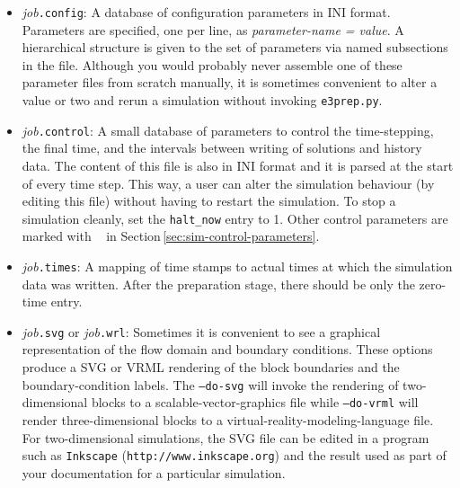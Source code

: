 \documentclass[12pt,a4paper,twoside]{article}
\begin{document}
         \begin{itemize}
           \item \textit{job}\texttt{.config}: 
             A database of configuration parameters in INI format.
             Parameters are specified, one per line, as \textit{parameter-name = value}.
             A hierarchical structure is given to the set of parameters via
             named subsections in the file.
             Although you would probably never assemble one of these parameter files
             from scratch manually, it is sometimes convenient to alter a value or two and rerun
             a simulation without invoking \texttt{e3prep.py}.
           \item \textit{job}\texttt{.control}: 
             A small database of parameters to control the time-stepping, the final time,
             and the intervals between writing of solutions and history data.
             The content of this file is also in INI format and it is parsed at the
             start of every time step.
             This way, a user can alter the simulation behaviour (by editing this file)
             without having to restart the simulation.
             To stop a simulation cleanly, set the \texttt{halt\_now} entry to 1.
             Other control parameters are marked with \ddag~ in Section\,\ref{sec:sim-control-parameters}.
           \item  \textit{job}\texttt{.times}:
             A mapping of time stamps to actual times at which the simulation
             data was written.
             After the preparation stage, there should be only the zero-time entry.
           \item \textit{job}\texttt{.svg} or \textit{job}\texttt{.wrl}:  
             Sometimes it is convenient to see a graphical representation of the flow domain 
             and boundary conditions.
             These options produce a SVG or VRML rendering of the block boundaries 
             and the boundary-condition labels.
             The \texttt{--do-svg} will invoke the rendering of two-dimensional blocks
             to a scalable-vector-graphics file while \texttt{--do-vrml} will render 
             three-dimensional blocks to a virtual-reality-modeling-language file.
             For two-dimensional simulations, the SVG file can be edited in a program such as \texttt{Inkscape}
             (\texttt{http://www.inkscape.org})
             and the result used as part of your documentation for a particular simulation.

\end{itemize}
\end{document}
